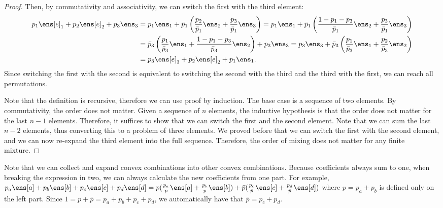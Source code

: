 \begin{mathSection}
\begin{proof}
	Then, by commutativity and associativity, we can switch the first with the third element:
	\begin{equation}
		\begin{aligned}
	 p_1 \ens[e]_1 + p_2 \ens[e]_2 + p_3 \ens_3 &= p_1 \ens_1 + \bar{p}_1\left(\frac{p_2}{\bar{p}_1}\ens_2 + \frac{p_3}{\bar{p}_1}\ens_3\right) = p_1 \ens_1 + \bar{p}_1\left(\frac{1-p_1-p_3}{\bar{p}_1}\ens_2 + \frac{p_3}{\bar{p}_1}\ens_3\right) \\
	 &= \bar{p}_3\left(\frac{p_1}{\bar{p}_3} \ens_1 + \frac{1-p_1-p_3}{\bar{p}_3}\ens_2\right) + p_3 \ens_3 = p_3 \ens_3 + \bar{p}_3\left(\frac{p_1}{\bar{p}_3} \ens_1 + \frac{p_2}{\bar{p}_3}\ens_2\right) \\
	 &= p_3 \ens[e]_3 + p_2 \ens[e]_2 + p_1 \ens_1.
		\end{aligned}
	\end{equation}
	Since switching the first with the second is equivalent to switching the second with the third and the third with the first, we can reach all permutations.
	
	Note that the definition is recursive, therefore we can use proof by induction. The base case is a sequence of two elements. By commutativity, the order does not matter. Given a sequence of $n$ elements, the inductive hypothesis is that the order does not matter for the last $n-1$ elements. Therefore, it suffices to show that we can switch the first and the second element. Note that we can sum the last $n-2$ elements, thus converting this to a problem of three elements. We proved before that we can switch the first with the second element, and we can now re-expand the third element into the full sequence. Therefore, the order of mixing does not matter for any finite mixture. 
\end{proof}

\begin{remark}
	Note that we can collect and expand convex combinations into other convex combinations. Because coefficients always sum to one, when breaking the expression in two, we can always calculate the new coefficients from one part. For example, $p_a \ens[a] + p_b \ens[b] + p_c \ens[c] + p_d \ens[d] = p(\frac{p_a}{p} \ens[a] + \frac{p_b}{p} \ens[b]) + \bar{p}(\frac{p_c}{\bar{p}} \ens[c] + \frac{p_d}{\bar{p}} \ens[d])$ where $p = p_a + p_b$ is defined only on the left part. Since $1 = p + \bar{p} = p_a +p_b + p_c + p_d$, we automatically have that $\bar{p} = p_c + p_d$.
\end{remark}
\end{mathSection}

